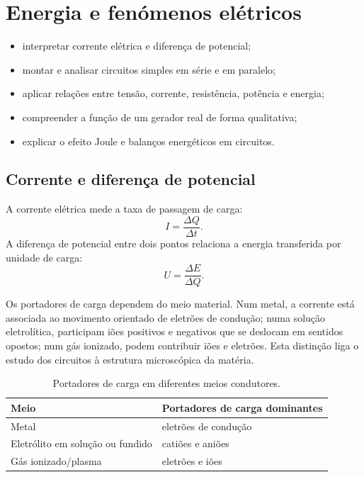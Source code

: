 \documentclass[11pt,a4paper,oneside]{book}
\begin{document}
\chapter{Energia e fenómenos elétricos}

\begin{objetivos}
\begin{itemize}
  \item interpretar corrente elétrica e diferença de potencial;
  \item montar e analisar circuitos simples em série e em paralelo;
  \item aplicar relações entre tensão, corrente, resistência, potência e energia;
  \item compreender a função de um gerador real de forma qualitativa;
  \item explicar o efeito Joule e balanços energéticos em circuitos.
\end{itemize}
\end{objetivos}

\section{Corrente e diferença de potencial}
A corrente elétrica mede a taxa de passagem de carga:
\[
I=\frac{\Delta Q}{\Delta t}.
\]
A diferença de potencial entre dois pontos relaciona a energia transferida por unidade de carga:
\[
U=\frac{\Delta E}{\Delta Q}.
\]

Os portadores de carga dependem do meio material. Num metal, a corrente está associada ao movimento orientado de eletrões de condução; numa solução eletrolítica, participam iões positivos e negativos que se deslocam em sentidos opostos; num gás ionizado, podem contribuir iões e eletrões. Esta distinção liga o estudo dos circuitos à estrutura microscópica da matéria.

\begin{table}[H]
\centering
\caption{Portadores de carga em diferentes meios condutores.}
\begin{tabularx}{\textwidth}{lX}
\toprule
Meio & Portadores de carga dominantes \\
\midrule
Metal & eletrões de condução \\
Eletrólito em solução ou fundido & catiões e aniões \\
Gás ionizado/plasma & eletrões e iões \\
\bottomrule
\end{tabularx}
\end{table}
\end{document}
